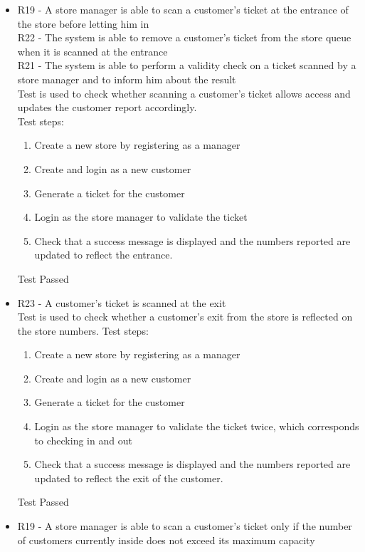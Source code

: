 \begin{itemize}
    \item R19 - A store manager is able to scan a customer’s ticket at the entrance of the store before letting him in\\
    R22 - The system is able to remove a customer’s ticket from the store queue when it is scanned at the entrance\\
    R21 - The system is able to perform a validity check on a ticket scanned by a store manager and to inform him about the result\\
    Test is used to check whether scanning a customer's ticket allows access and updates the customer report accordingly. \\
    Test steps:\\
    \begin{enumerate}
        \item Create a new store by registering as a manager
        \item Create and login as a new customer
        \item Generate a ticket for the customer
        \item Login as the store manager to validate the ticket
        \item Check that a success message is displayed and the numbers reported are updated to reflect the entrance.
    \end{enumerate}
    Test Passed
    \item R23 - A customer's ticket is scanned at the exit \\
    Test is used to check whether a customer's exit from the store is reflected on the store numbers.
    Test steps: \\
    \begin{enumerate}
        \item Create a new store by registering as a manager
        \item Create and login as a new customer
        \item Generate a ticket for the customer
        \item Login as the store manager to validate the ticket twice, which corresponds to checking in and out
        \item Check that a success message is displayed and the numbers reported are updated to reflect the exit of the customer.
    \end{enumerate}
    Test Passed \\
    \item R19 - A store manager is able to scan a customer's ticket only if the number of customers currently inside does not exceed its maximum capacity \\

\end{itemize}
